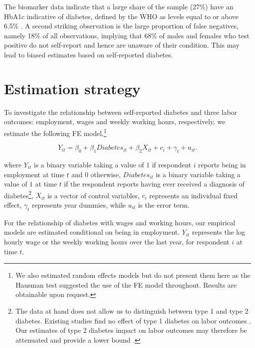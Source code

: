 \documentclass[12pt,english]{article}
\begin{document}
The biomarker data indicate that a large share of the sample (27\%) have an \ac{HbA1c} indicative of diabetes, defined by the \ac{WHO} as levels equal to or above 6.5\% \parencite{WorldHealthOrganization2011}. A second striking observation is the large proportion of false negatives, namely 18\% of all observations, implying that 68\% of males and females who test positive do not self-report and hence are unaware of their condition. This may lead to biased estimates based on self-reported diabetes.





\section{\label{sec:Estimation Strategy}Estimation strategy}


\textit{}

To investigate the relationship between self-reported diabetes and three labor outcomes: employment, wages and weekly working hours, respectively, we estimate the following \acf{FE} model.\footnote{We also estimated random effects models but do not present them here as the Hausman test suggested the use of the FE model throughout. Results are obtainable upon request.}


\noindent 
\begin{equation}
Y_{it}=\beta_{0}+\beta_{1}Diabetes_{it}+\beta_{2}X_{it}+c_{i}+\gamma_{t}+u_{it}.\label{eq:cha4_employed}
\end{equation}


where $Y_{it}$ is a binary variable taking a value of $1$ if respondent $i$ reports being in employment at time $t$ and $0$ otherwise, $Diabetes_{it}$ is a binary variable taking a value of $1$ at time $t$ if the respondent reports having ever received a diagnosis of diabetes\footnote{The data at hand does not allow us to distinguish between type 1 and type 2 diabetes. Existing studies find no effect of type 1 diabetes on labor outcomes . Our estimates of type 2 diabetes impact on labor outcomes may therefore be attenuated and provide a lower bound \parencite{Minor2011,Minor2015}.}, $X_{it}$ is a vector of control variables, $c_{i}$ represents an individual fixed effect, $\gamma_{t}$ represents year dummies, while $u_{it}$ is the error term.

For the relationship of diabetes with wages and working hours, our empirical models are estimated conditional on being in employment. $Y_{it}$ represents the log hourly wage or the weekly working hours over the last year, for respondent $i$ at time $t$.
\end{document}
